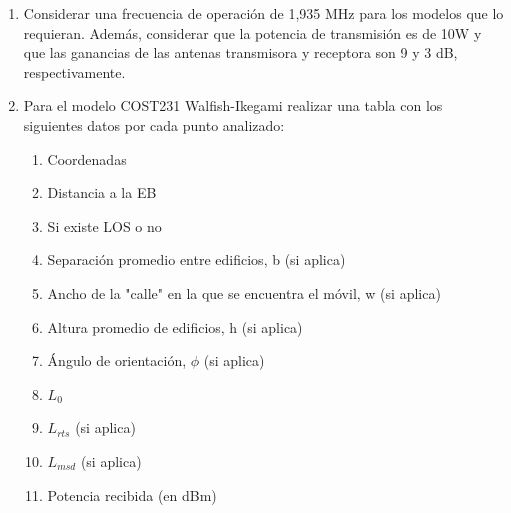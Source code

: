 \begin{enumerate}
    \item Considerar una frecuencia de operación de 1,935 MHz para los modelos que lo requieran. Además, considerar que la potencia de transmisión es de 10W y que las ganancias de las antenas transmisora y receptora son 9 y 3 dB, respectivamente.
    \item Para el modelo COST231 Walfish-Ikegami realizar una tabla con los siguientes datos por cada punto analizado:
          \begin{enumerate}
              \item Coordenadas
              \item Distancia a la EB
              \item Si existe LOS o no
              \item Separación promedio entre edificios, b (si aplica)
              \item Ancho de la "calle" en la que se encuentra el móvil, w (si aplica)
              \item Altura promedio de edificios, h (si aplica)
              \item Ángulo de orientación, $\phi$ (si aplica)
              \item $L_0$
              \item $L_{rts}$ (si aplica)
              \item $L_{msd}$ (si aplica)
              \item Potencia recibida (en dBm)
          \end{enumerate}
          

\end{enumerate}

